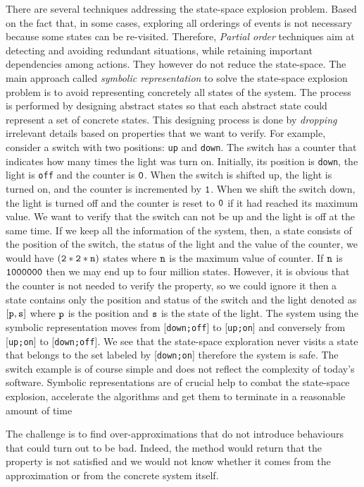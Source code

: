                    
There are several techniques addressing the state-space explosion problem.
Based on the fact that, in some cases, exploring all orderings of events is not necessary because some states can be re-visited. Therefore, \emph{Partial order} techniques aim at detecting and avoiding
redundant situations, while retaining important dependencies among
actions. They however do not reduce the state-space. The main approach called \emph{symbolic
  representation}  to solve the state-space explosion problem is to avoid representing concretely all states of the system. The process is performed by designing abstract states so that each abstract state could represent a set of concrete states.  This designing process is done by \emph{dropping} irrelevant details based on properties that we want to verify. For example, consider a switch with two positions: {\tt up} and {\tt down}. The switch has a counter that indicates how many times the light was turn on. Initially, its position is {\tt down}, the light is {\tt off} and the counter is $\tt 0$. When the switch is shifted up, the light is turned on, and the counter is incremented by $\tt 1$. When we shift the switch down, the light is turned off and the counter is reset to $\tt 0$ if it had reached its maximum value. We want to verify that the switch can not be up and the light is off at the same time. If we keep all the information of the system, then, a state consists of the position of the switch, the status of the light and the value of the counter, we would have $\tt (2*2*n)$ states where $\tt n$ is the maximum value of counter. If $\tt n$ is $\tt 1000000$ then we may end up to four million states.  However, it is obvious that the counter is not needed to verify the property, so we could ignore it then a state contains only the position and status of the switch and the light denoted as $\tt [p,s]$ where $\tt p$ is the position and $\tt s$ is the state of the light. The system using the symbolic representation moves from  [{\tt down;off}]  to  [{\tt up;on}]  and conversely from  [{\tt up;on}]  to  [{\tt down;off}]. We see that the state-space exploration never visits a state that belongs to the set labeled by  [{\tt down;on}]  therefore the system is safe. The switch example is of course simple and does not reflect the complexity of today’s software. Symbolic representations are of crucial help to combat the state-space explosion, accelerate the algorithms and get them to terminate in a reasonable amount of time


The challenge is to find over-approximations that do not introduce
behaviours that could turn out to be bad. Indeed, the method would
return that the property is not satisfied and we would not know
whether it comes from the approximation or from the concrete system
itself. %
                                   


